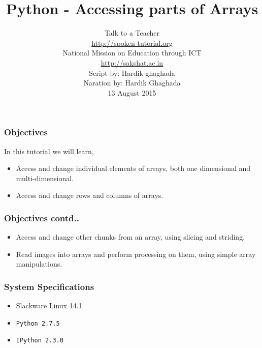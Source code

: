 \documentclass[17pt,compress]{beamer}
\author[FOSSEE]{}
\institute[IIT Bombay]{}
\date[]{}
\begin{document}
\sffamily \bfseries
\title
[Accessing parts of Arrays]
{Python - Accessing parts of Arrays}
\author
[FOSSEE, IIT - Bombay]
{\small Talk to a Teacher\\{\color{blue}\url{http://spoken-tutorial.org}}\\National Mission on Education
 through ICT\\{\color{blue}\url{http://sakshat.ac.in}} \\[0.5cm]{\tiny Script by: Hardik ghaghada \\ Naration by: Hardik Ghaghada \\ 13 August 2015}}

\begin{frame}
   \titlepage
\end{frame}
\begin{frame}
\frametitle{Objectives}
\label{sec-2.1}

  In this tutorial we will learn, \pause
   

\begin{itemize}
\item Access and change individual elements of arrays, both one
    dimensional and multi-dimensional.\pause
\item Access and change rows and columns of arrays.
\end{itemize}
\end{frame}
\begin{frame}
\frametitle{Objectives contd..}
\label{sec-2.2} 

\begin{itemize}
\item Access and change other chunks from an array, using slicing
    and striding.\pause
\item Read images into arrays and perform processing on them, using
    simple array manipulations.
\end{itemize}
\end{frame}
\begin{frame}
\frametitle{System Specifications}\pause
\begin{itemize}
\item Slackware Linux 14.1\pause
\item \texttt{Python 2.7.5} \pause
\item \texttt{IPython 2.3.0}
\end{itemize}
\end{frame}
\end{document}
